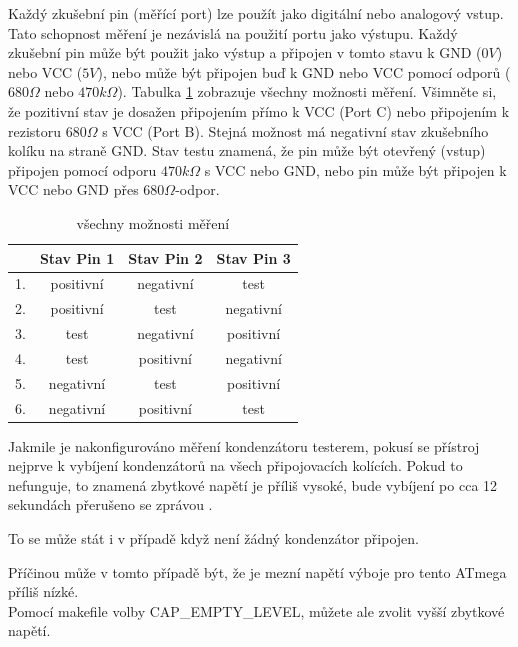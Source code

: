 Každý zkušební pin (měřící port) lze použít jako digitální nebo analogový vstup.
Tato schopnost měření je nezávislá na použití portu jako výstupu.
Každý zkušební pin může být použit jako výstup a připojen v tomto stavu k GND (\(0V\)) nebo VCC (\(5V\)),
nebo může být připojen buď k GND nebo VCC pomocí odporů (\(680\Omega\) nebo \(470k\Omega\)).
Tabulka \ref{tab:case} zobrazuje všechny možnosti měření.
Všimněte si, že pozitivní stav je dosažen připojením přímo k VCC (Port C) nebo
připojením k rezistoru \(680\Omega\) s VCC (Port B).
Stejná možnost má negativní stav zkušebního kolíku na straně GND.
Stav testu znamená, že pin může být otevřený (vstup) připojen pomocí odporu \(470k\Omega\) s VCC nebo GND,
nebo pin může být připojen k VCC nebo GND přes \(680\Omega\)-odpor.

\begin{table}[H]
  \begin{center}
    \begin{tabular}{| l | c | c | c |}
    \hline
      & Stav Pin 1 & Stav Pin 2 & Stav Pin 3 \\
    \hline
   1. & positivní    &  negativní   &  test \\
   2. & positivní    &  test      & negativní \\
   3. & test       &  negativní   & positivní \\
   4. & test       &  positivní   & negativní \\
   5. & negativní    &  test      & positivní \\
   6. & negativní    &  positivní   &  test  \\
    \hline
    \end{tabular}
  \end{center}
  \caption{všechny možnosti měření}
  \label{tab:case} 
\end{table}

Jakmile je nakonfigurováno měření kondenzátoru testerem,  pokusí se přístroj nejprve
k vybíjení kondenzátorů na všech připojovacích kolících.
Pokud to nefunguje, to znamená zbytkové napětí je příliš vysoké, bude vybíjení
po cca 12 sekundách přerušeno se zprávou .

To se může stát i v případě když není žádný kondenzátor připojen.

Příčinou může v tomto případě být, že je mezní napětí výboje pro tento
ATmega příliš nízké.\\ Pomocí makefile volby CAP\_EMPTY\_LEVEL, můžete ale zvolit vyšší zbytkové napětí.
